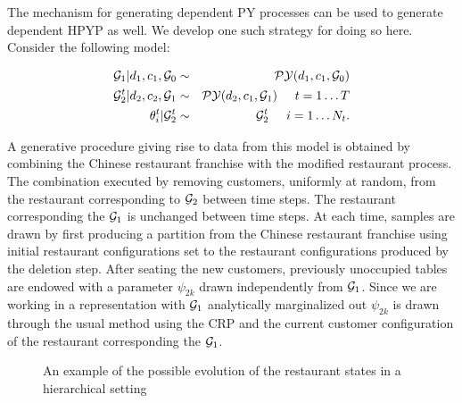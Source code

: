 The mechanism for generating dependent PY processes can be used to generate dependent HPYP as well.  We develop one such strategy for doing so here.  Consider the following model: 

\begin{eqnarray*}
\G_1 | d_1, c_1, \G_0 &\sim& \PY(d_1, c_1, \G_0)\\
\G_2^t | d_2, c_2, \G_1&\sim& \PY(d_2, c_1, \G_1) \hspace{.5cm} t = 1\dots T\\
\theta^t_i | \G_2^t &\sim& \G_2^t \hspace{.5cm} i = 1\dots N_t.
\end{eqnarray*}

A generative procedure giving rise to data from this model is obtained by combining the Chinese restaurant franchise with the modified restaurant process.  The combination executed by removing customers, uniformly at random, from the restaurant corresponding to $\G_2$ between time steps.  The restaurant corresponding the $\G_1$ is unchanged between time steps. At each time, samples are drawn by first producing a partition from the Chinese restaurant franchise using initial restaurant configurations set to the restaurant configurations produced by the deletion step.  After seating the new customers,  previously unoccupied tables are endowed with a parameter $\psi_{2k}$ drawn independently from $\G_1$.  Since we are working in a representation with $\G_1$ analytically marginalized out $\psi_{2k}$ is drawn through the usual method using the CRP and the current customer configuration of the restaurant corresponding the $\G_1$.


\begin{figure}[h!tbp] 
	\label{figVHPY}
	\begin{center}
		\caption{An example of the possible evolution of the restaurant states in a hierarchical setting}
	\end{center} 
\end{figure} 

